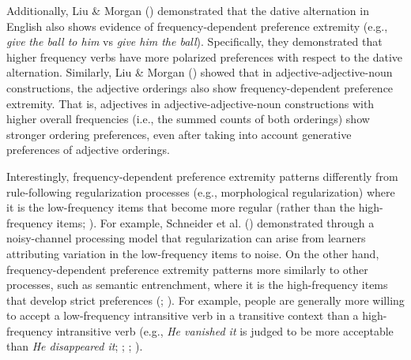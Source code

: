 \documentclass[
  12pt,
  letterpaper,
]{scrreport}
\begin{document}
Additionally, Liu \& Morgan
()
demonstrated that the dative alternation in English also shows evidence
of frequency-dependent preference extremity (e.g., \emph{give}
\emph{the ball to him} vs \emph{give him the ball}). Specifically, they
demonstrated that higher frequency verbs have more polarized preferences
with respect to the dative alternation. Similarly, Liu \& Morgan
()
showed that in adjective-adjective-noun constructions, the adjective
orderings also show frequency-dependent preference extremity. That is,
adjectives in adjective-adjective-noun constructions with higher overall
frequencies (i.e., the summed counts of both orderings) show stronger
ordering preferences, even after taking into account generative
preferences of adjective orderings.

Interestingly, frequency-dependent preference extremity patterns
differently from rule-following regularization processes (e.g.,
morphological regularization) where it is the low-frequency items that
become more regular (rather than the high-frequency items;
). For example, Schneider et al.
() demonstrated
through a noisy-channel processing model that regularization can arise
from learners attributing variation in the low-frequency items to noise.
On the other hand, frequency-dependent preference extremity patterns
more similarly to other processes, such as semantic entrenchment, where
it is the high-frequency items that develop strict preferences
(;
).
For example, people are generally more willing to accept a low-frequency
intransitive verb in a transitive context than a high-frequency
intransitive verb (e.g., \emph{He vanished it} is judged to be more
acceptable than \emph{He disappeared it};
;
;
).
\end{document}
